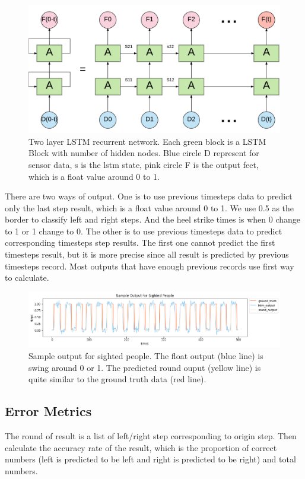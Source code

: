 \documentclass[11pt]{article}
\begin{document}
{\begin{figure}[ht]
\centering
\includegraphics[scale=0.3]{LSTM3}
\caption{Two layer LSTM recurrent network. Each green block is a LSTM Block with number of hidden nodes. Blue circle D represent for sensor data, s is the lstm state, pink circle F is the output feet, which is a float value around 0 to 1.}
\label{fig:LSTM}
\end{figure}


There are two ways of output. One is to use previous timesteps data to predict only the last step result, which is a float value around 0 to 1. We use 0.5 as the border to classify left and right steps. And the heel strike times is when 0 change to 1 or 1 change to 0. The other is to use previous timesteps data to predict corresponding timesteps step results. The first one cannot predict the first timesteps result, but it is more precise since all result is predicted by previous timesteps record. Most outputs that have enough previous records use first way to calculate.


\begin{figure}[ht]
\centering
\includegraphics[scale=0.5]{output_sighted}
\caption{Sample output for sighted people. The float output (blue line) is swing around 0 or 1. The predicted round ouput (yellow line) is quite similar to the ground truth data (red line).}
\label{fig:output_sighted}
\end{figure}



\subsection{Error Metrics}
The round of result is a list of left/right step corresponding to origin step. Then calculate the accuracy rate of the result, which is the proportion of correct numbers (left is predicted to be left and right is predicted to be right) and total numbers.


}
\end{document}
